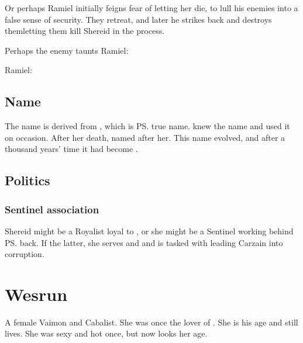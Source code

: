 Or perhaps Ramiel initially feigns fear of letting her die, to lull his enemies into a false sense of security. They retreat, and later he strikes back and destroys them\dash letting them kill Shereid in the process. 

Perhaps the enemy taunts Ramiel: 

Ramiel: 









\subsection{Name}
The name  is derived from , which is \ps{} true name. 
\Belzir{} knew the name and used it on occasion. 
After her death,  named  \Shiaraid{} after her. 
This name evolved, and after a thousand years' time it had become . 









\subsection{Politics}
\subsubsection{Sentinel association}
Shereid might be a Royalist loyal to \Belzir, or she might be a Sentinel working behind \ps{\Belzir}{} back. If the latter, she serves \Psyrex{} and \Secherdamon{} and is tasked with leading Carzain into corruption. 















\section{Wesrun}
A female \human{} Vaimon and Cabalist. 
She was once the lover of . 
She is his age and still lives. 
She was sexy and hot once, but now looks her age. 

